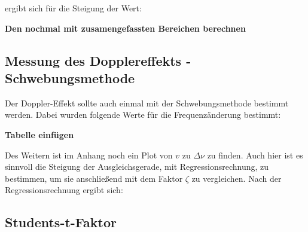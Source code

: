 ergibt sich für die Steigung der Wert:

\textbf{Den nochmal mit zusamengefassten Bereichen berechnen}


\subsection{Messung des Dopplereffekts - Schwebungsmethode}
Der Doppler-Effekt sollte auch einmal mit der Schwebungsmethode 
bestimmt werden.
Dabei wurden folgende Werte für die Frequenzänderung 
bestimmt:

\textbf{Tabelle einfügen}

Des Weitern ist im Anhang noch ein Plot von $v$ zu $\Delta \nu$ 
zu finden. Auch hier ist es sinnvoll die Steigung der Ausgleichsgerade, mit 
Regressionsrechnung, zu bestimmen, um sie anschließend mit dem 
Faktor $\zeta$ zu vergleichen.
Nach der Regressionsrechnung ergibt sich:

\subsection{Students-t-Faktor}